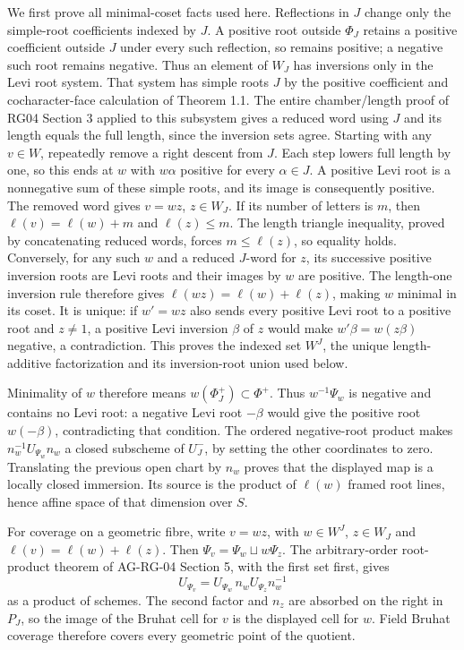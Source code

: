 \documentclass[11pt,a4paper,openany]{report}
\begin{document}
We first prove all minimal-coset facts used here. Reflections in \(J\) change only the simple-root coefficients indexed by \(J\). A positive root outside \(\Phi_J\) retains a positive coefficient outside \(J\) under every such reflection, so remains positive; a negative such root remains negative. Thus an element of \(W_J\) has inversions only in the Levi root system. That system has simple roots \(J\) by the positive coefficient and cocharacter-face calculation of Theorem 1.1. The entire chamber/length proof of RG04 Section 3 applied to this subsystem gives a reduced word using \(J\) and its length equals the full length, since the inversion sets agree. Starting with any \(v\in W\), repeatedly remove a right descent from \(J\). Each step lowers full length by one, so this ends at \(w\) with \(w\alpha\) positive for every \(\alpha\in J\). A positive Levi root is a nonnegative sum of these simple roots, and its image is consequently positive. The removed word gives \(v=wz\), \(z\in W_J\). If its number of letters is \(m\), then \(\ell(v)=\ell(w)+m\) and \(\ell(z)\le m\). The length triangle inequality, proved by concatenating reduced words, forces \(m\le\ell(z)\), so equality holds. Conversely, for any such \(w\) and a reduced \(J\)-word for \(z\), its successive positive inversion roots are Levi roots and their images by \(w\) are positive. The length-one inversion rule therefore gives \(\ell(wz)=\ell(w)+\ell(z)\), making \(w\) minimal in its coset. It is unique: if \(w'=wz\) also sends every positive Levi root to a positive root and \(z\ne1\), a positive Levi inversion \(\beta\) of \(z\) would make \(w'\beta=w(z\beta)\) negative, a contradiction. This proves the indexed set \(W^J\), the unique length-additive factorization and its inversion-root union used below.

Minimality of \(w\) therefore means \(w(\Phi_J^+)\subset\Phi^+\). Thus \(w^{-1}\Psi_w\) is negative and contains no Levi root: a negative Levi root \(-\beta\) would give the positive root \(w(-\beta)\), contradicting that condition. The ordered negative-root product makes \(n_w^{-1}U_{\Psi_w}n_w\) a closed subscheme of \(U_J^-\), by setting the other coordinates to zero. Translating the previous open chart by \(n_w\) proves that the displayed map is a locally closed immersion. Its source is the product of \(\ell(w)\) framed root lines, hence affine space of that dimension over \(S\).

For coverage on a geometric fibre, write \(v=wz\), with \(w\in W^J\), \(z\in W_J\) and \(\ell(v)=\ell(w)+\ell(z)\). Then \(\Psi_v=\Psi_w\sqcup w\Psi_z\). The arbitrary-order root-product theorem of AG-RG-04 Section 5, with the first set first, gives \[
U_{\Psi_v}=U_{\Psi_w}\,n_wU_{\Psi_z}n_w^{-1}
\] as a product of schemes. The second factor and \(n_z\) are absorbed on the right in \(P_J\), so the image of the Bruhat cell for \(v\) is the displayed cell for \(w\). Field Bruhat coverage therefore covers every geometric point of the quotient.
\end{document}
